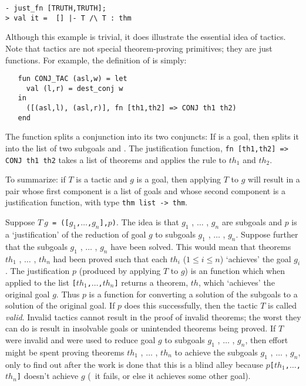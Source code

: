 \begin{session}\begin{verbatim}
- just_fn [TRUTH,TRUTH];
> val it =  [] |- T /\ T : thm
\end{verbatim}\end{session}

    Although this example is trivial, it does illustrate the essential
    idea of tactics.  Note that tactics are not special
    theorem-proving primitives; they are just \ML{} functions.  For
    example, the definition of  is simply:

\begin{hol}\begin{verbatim}
   fun CONJ_TAC (asl,w) = let
     val (l,r) = dest_conj w
   in
     ([(asl,l), (asl,r)], fn [th1,th2] => CONJ th1 th2)
   end
\end{verbatim}\end{hol}

\noindent The \ML{} function  splits a conjunction into its
two conjuncts: If  is a
goal, then  splits it into the list of two subgoals
 and . The justification function,
{\small\verb|fn [th1,th2] => CONJ th1 th2|} takes a list
\ml{[$th_1$,$th_2$]} of theorems and applies the rule  to
$th_1$ and $th_2$.

To summarize: if $T$ is a tactic and $g$ is a goal, then applying $T$
to $g$ will result in a pair whose first component is a list of goals
and whose second component is a justification function, with \ML{} type
{\small\verb|thm list -> thm|}.

Suppose
$T\ g${\small\verb| = ([|}$g_1${\small\verb|,|}$\ldots${\small\verb|,|}$g_n${\small\verb|],|}$p${\small\verb|)|}.
The idea is that $g_1$ , $\ldots$ , $g_n$ are subgoals and $p$ is a
`justification' of the reduction of goal $g$ to subgoals $g_1$ ,
$\ldots$ , $g_n$.  Suppose further that the subgoals $g_1$ , $\ldots$
, $g_n$ have been solved.  This would mean that theorems $th_1$ ,
$\ldots$ , $th_n$ had been proved such that each $th_i$ ($1\leq i\leq
n$) `achieves' the goal $g_i$.  The justification $p$ (produced by
applying $T$ to $g$) is an \ML{} function which when applied to the
list
{\small\verb|[|}$th_1${\small\verb|,|}$\ldots${\small\verb|,|}$th_n${\small\verb|]|}
returns a theorem, $th$, which `achieves' the original goal $g$.  Thus
$p$ is a function for converting a solution of the subgoals to a
solution of the original goal. If $p$ does this successfully, then the
tactic $T$ is called {\it valid\/}.  Invalid tactics cannot result in
the proof of invalid theorems; the worst they can do is result in
insolvable goals or unintended theorems being proved.  If $T$ were
invalid and were used to reduce goal $g$ to subgoals $g_1$ , $\ldots$
, $g_n$, then effort might be spent proving theorems $th_1$ , $\ldots$
, $th_n$ to achieve the subgoals $g_1$ , $\ldots$ , $g_n$, only to
find out after the work is done that this is a blind alley because
$p${\small\verb|[|}$th_1${\small\verb|,|}$\ldots${\small\verb|,|}$th_n${\small\verb|]|}
doesn't achieve $g$ (\ie\ it fails, or else it achieves some other
goal).

